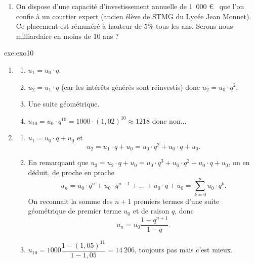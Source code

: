 {\begin{enumerate}
\begin{enumerate}
\item On dispose d'une capacité d'investissement annuelle de 1~000 \euro~ que l'on confie à un courtier expert (ancien élève de STMG du Lycée Jean Monnet). Ce placement est rémunéré à hauteur de $5 \%$ tous les ans. Serons nous milliardaire en moins de 10 ans ?
\end{enumerate}
\end{enumerate}
}{exe:exo10}{
\begin{enumerate}
\item
\begin{enumerate} 
\item $u_1 = u_0 \cdot q$.
\item $u_2 = u_1 \cdot q$ (car les intérêts générés sont réinvestis) donc $u_2=u_0 \cdot q^2$.
\item Une suite géométrique.
\item $u_10 = u_0 \cdot q^10 = 1000 \cdot (1,02)^10 \approx 1218$ donc non...
\end{enumerate}
\item
\begin{enumerate}
\item $u_1 = u_0 \cdot q + u_0$ et 
\[ u_2 = u_1 \cdot q + u_0 = u_0 \cdot q^2 + u_0 \cdot q + u_0 . \]
\item En remarquant que $u_3 = u_2 \cdot q + u_0 = u_0 \cdot q^3 + u_0 \cdot q^2 + u_0 \cdot q + u_0$, 
on en déduit, de proche en proche
\[ u_n = u_0 \cdot q^n + u_0 \cdot q^{n-1} + \dots + u_0 \cdot q + u_0 = \sum_{k=0}^n u_0 \cdot q^k . \]
On reconnait la somme des $n+1$ premiers termes d'une suite géométrique de premier terme $u_0$ et de raison $q$, donc
\[ u_n = u_0 \dfrac{1-q^{n+1}}{1-q} . \]
\item $u_10 = 1000 \dfrac{1-(1,05)^{11}}{1-1,05} = 14~206$, toujours pas mais c'est mieux.
\end{enumerate}
\end{enumerate}
}

\newpage
{}
\shipoutAnswer

